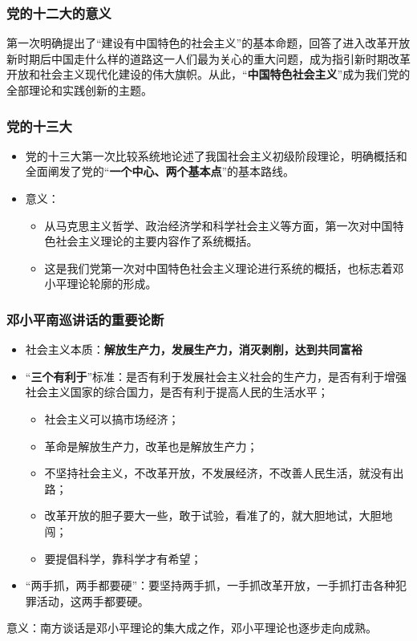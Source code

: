 \documentclass[12pt,openany]{ctexbook}
\begin{document}
\subsubsection{党的十二大的意义}
第一次明确提出了“建设有中国特色的社会主义”的基本命题，回答了进入改革开放新时期后中国走什么样的道路这一人们最为关心的重大问题，成为指引新时期改革开放和社会主义现代化建设的伟大旗帜。从此，“\textbf{中国特色社会主义}”成为我们党的全部理论和实践创新的主题。
\subsubsection{党的十三大}
\begin{itemize}
  \item 党的十三大第一次比较系统地论述了我国社会主义初级阶段理论，明确概括和全面阐发了党的“\textbf{一个中心、两个基本点}”的基本路线。
  \item 意义：
\begin{itemize}
  \item 从马克思主义哲学、政治经济学和科学社会主义等方面，第一次对中国特色社会主义理论的主要内容作了系统概括。
  \item 这是我们党第一次对中国特色社会主义理论进行系统的概括，也标志着邓小平理论轮廓的形成。
\end{itemize}
\end{itemize}
\subsubsection{邓小平南巡讲话的重要论断}
\begin{itemize}
  \item 社会主义本质：\textbf{解放生产力，发展生产力，消灭剥削，达到共同富裕}
  \item “\textbf{三个有利于}”标准：是否有利于发展社会主义社会的生产力，是否有利于增强社会主义国家的综合国力，是否有利于提高人民的生活水平；
\begin{itemize}
  \item 社会主义可以搞市场经济；
  \item 革命是解放生产力，改革也是解放生产力；
  \item 不坚持社会主义，不改革开放，不发展经济，不改善人民生活，就没有出路；
  \item 改革开放的胆子要大一些，敢于试验，看准了的，就大胆地试，大胆地闯；
  \item 要提倡科学，靠科学才有希望；
\end{itemize}
  \item “两手抓，两手都要硬”：要坚持两手抓，一手抓改革开放，一手抓打击各种犯罪活动，这两手都要硬。
\end{itemize}
意义：南方谈话是邓小平理论的集大成之作，邓小平理论也逐步走向成熟。
\end{document}
